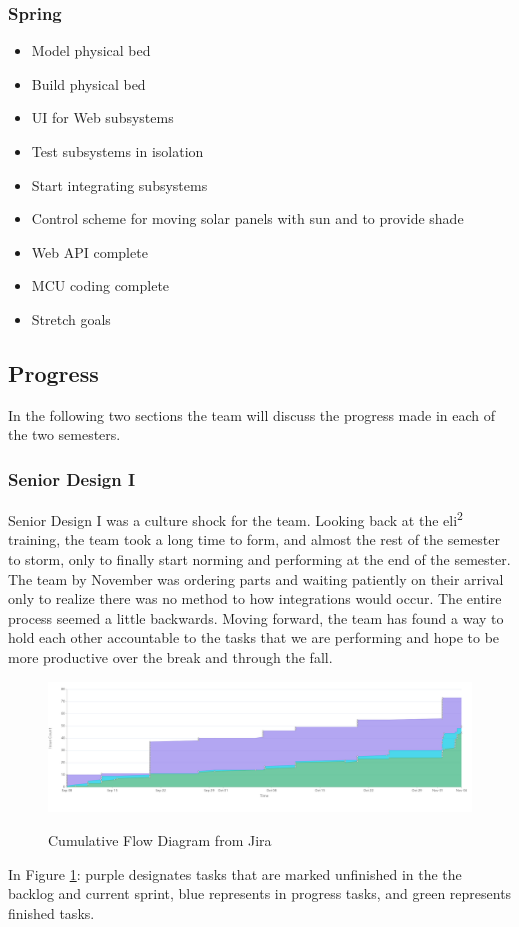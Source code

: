 \subsubsection{Spring}
\begin{itemize}
    \item Model physical bed
    \item Build physical bed
    \item UI for Web subsystems
    \item Test subsystems in isolation
    \item Start integrating subsystems
    \item Control scheme for moving solar panels with sun and to provide shade
    \item Web API complete
    \item MCU coding complete
    \item Stretch goals
\end{itemize}

\subsection{Progress}
In the following two sections the team will discuss the progress made in each of the two semesters.
\subsubsection{Senior Design I}
Senior Design I was a culture shock for the team. Looking back at the eli\textsuperscript{2} training, the team took a long time to form, and almost the rest of the semester to storm, only to finally start norming and performing at the end of the semester. The team by November was ordering parts and waiting patiently on their arrival only to realize there was no method to how integrations would occur. The entire process seemed a little backwards. Moving forward, the team has found a way to hold each other accountable to the tasks that we are performing and hope to be more productive over the break and through the fall.
\begin{figure}[H]
    \caption{Cumulative Flow Diagram from Jira}
    \centering
    \includegraphics[width=\textwidth]{images/Cumulative flow diagram.png}
    \label{fig:cumulativeflow}
\end{figure}
In Figure \ref{fig:cumulativeflow}: purple designates tasks that are marked unfinished in the the backlog and current sprint, blue represents in progress tasks, and green represents finished tasks.

